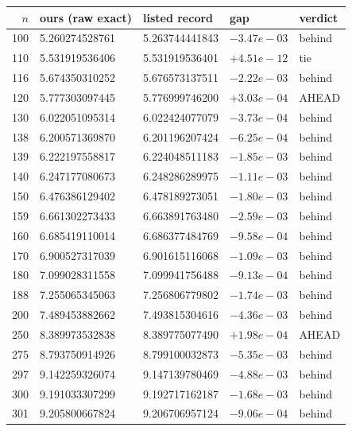 \begin{tabular}{rllll}
\hline
$n$ & ours (raw exact) & listed record & gap & verdict \\
\hline
100 & 5.260274528761 & 5.263744441843 & $-3.47e-03$ & behind \\
110 & 5.531919536406 & 5.531919536401 & $+4.51e-12$ & tie \\
116 & 5.674350310252 & 5.676573137511 & $-2.22e-03$ & behind \\
120 & 5.777303097445 & 5.776999746200 & $+3.03e-04$ & AHEAD \\
130 & 6.022051095314 & 6.022424077079 & $-3.73e-04$ & behind \\
138 & 6.200571369870 & 6.201196207424 & $-6.25e-04$ & behind \\
139 & 6.222197558817 & 6.224048511183 & $-1.85e-03$ & behind \\
140 & 6.247177080673 & 6.248286289975 & $-1.11e-03$ & behind \\
150 & 6.476386129402 & 6.478189273051 & $-1.80e-03$ & behind \\
159 & 6.661302273433 & 6.663891763480 & $-2.59e-03$ & behind \\
160 & 6.685419110014 & 6.686377484769 & $-9.58e-04$ & behind \\
170 & 6.900527317039 & 6.901615116068 & $-1.09e-03$ & behind \\
180 & 7.099028311558 & 7.099941756488 & $-9.13e-04$ & behind \\
188 & 7.255065345063 & 7.256806779802 & $-1.74e-03$ & behind \\
200 & 7.489453882662 & 7.493815304616 & $-4.36e-03$ & behind \\
250 & 8.389973532838 & 8.389775077490 & $+1.98e-04$ & AHEAD \\
275 & 8.793750914926 & 8.799100032873 & $-5.35e-03$ & behind \\
297 & 9.142259326074 & 9.147139780469 & $-4.88e-03$ & behind \\
300 & 9.191033307299 & 9.192717162187 & $-1.68e-03$ & behind \\
301 & 9.205800667824 & 9.206706957124 & $-9.06e-04$ & behind \\
\hline
\end{tabular}
